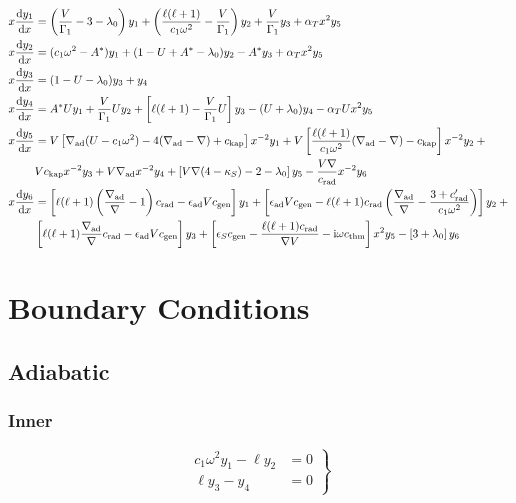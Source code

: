 \documentclass{article}
\newcommand{\diff}{\ensuremath{\mathrm{d}}}
\newcommand{\ii}{\ensuremath{\mathrm{i}}}
\newcommand{\lz}{\ensuremath{\lambda_{0}}}
\newcommand{\Vg}{\ensuremath{\frac{V}{\Gamma_{1}}}}
\newcommand{\As}{\ensuremath{A^{\ast}}}
\newcommand{\aT}{\ensuremath{\alpha_{T}}}
\newcommand{\nabad}{\ensuremath{\nabla_{\rm ad}}}
\newcommand{\kapS}{\ensuremath{\kappa_{S}}}
\newcommand{\epsad}{\ensuremath{\epsilon_{\rm ad}}}
\newcommand{\epsS}{\ensuremath{\epsilon_{S}}}
\newcommand{\crad}{\ensuremath{c_{\rm rad}}}
\newcommand{\cgen}{\ensuremath{c_{\rm gen}}}
\newcommand{\cthm}{\ensuremath{c_{\rm thm}}}
\newcommand{\ckap}{\ensuremath{c_{\rm kap}}}
\begin{document}
\begin{align*}
x \frac{\diff y_{1}}{\diff x} &=
\left(\Vg - 3 - \lz \right) y_{1} +
\left(\frac{\ell(\ell+1)}{c_{1} \omega^{2}} - \Vg \right) y_{2} +
\Vg y_{3} +
\aT x^{2} y_{5} \\
x \frac{\diff y_{2}}{\diff x} &=
(c_{1} \omega^{2} - \As ) y_{1} +
(1 - U + \As - \lz) y_{2} -
\As y_{3} +
\aT x^{2} y_{5} \\
x \frac{\diff y_{3}}{\diff x} &=
(1 - U - \lz) y_{3} +
y_{4} \\
x \frac{\diff y_{4}}{\diff x} &=
\As U y_{1} +
\Vg U y_{2} +
\left[ \ell(\ell+1) - \Vg U \right] y_{3} -
(U + \lz) y_{4}
- \aT U x^{2} y_{5} \\
x \frac{\diff y_{5}}{\diff x} &=
V \left[ \nabad (U - c_{1}\omega^{2}) - 4 (\nabad - \nabla) + \ckap \right] x^{-2} y_{1} + 
V \left[ \frac{\ell(\ell+1)}{c_{1} \omega^{2}} (\nabad - \nabla) - \ckap \right] x^{-2} y_{2} + \mbox{} \\
& 
V \ckap x^{-2} y_{3} + 
V \nabad x^{-2} y_{4} + 
\left[ V \nabla (4 - \kapS) - 2 - \lz \right] y_{5} -
\frac{V \nabla}{\crad} x^{-2} y_{6} \\
x \frac{\diff y_{6}}{\diff x} &=
\left[ \ell(\ell+1)\left( \frac{\nabad}{\nabla} - 1 \right) \crad - \epsad V \cgen \right] y_{1} +
\left[ \epsad V \cgen - \ell(\ell+1)\crad \left( \frac{\nabad}{\nabla} - \frac{3 + \crad'}{c_{1}\omega^{2}} \right) \right] y_{2} + \mbox{} \\
&
\left[ \ell(\ell+1) \frac{\nabad}{\nabla} \crad - \epsad V \cgen \right] y_{3} +
\left[ \epsS \cgen - \frac{\ell(\ell+1)\crad}{\nabla V} - \ii \omega \cthm\right] x^{2} y_{5} -
\left[ 3 + \lz \right] y_{6}
\end{align*}


\section*{Boundary Conditions}

\subsection*{Adiabatic}

\subsubsection*{Inner}

\begin{equation*}
\left.
\begin{aligned}
c_{1} \omega^{2} y_{1} - \ell y_{2} &= 0 \\
\ell y_{3} - y_{4} &= 0
\end{aligned}
\right\}
\end{equation*}
\end{document}
